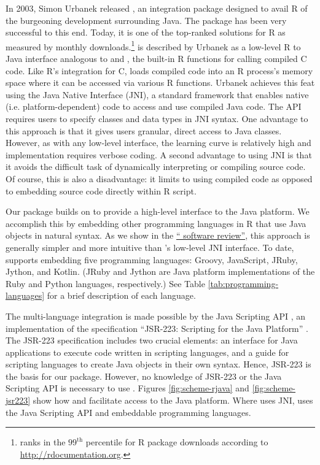 In 2003, Simon Urbanek released  \citeyearpar{rjava}, an integration package designed to avail R of the burgeoning development surrounding Java. The package has been very successful to this end. Today, it is one of the top-ranked solutions for R as measured by monthly downloads.\footnote{ ranks in the $99^{\text{th}}$ percentile for R package downloads according to \url{http://rdocumentation.org}.}  is described by Urbanek as a low-level R to Java interface analogous to  and , the built-in R functions for calling compiled C code. Like R's integration for C,  loads compiled code into an R process's memory space where it can be accessed via various R functions. Urbanek achieves this feat using the Java Native Interface (JNI), a standard framework that enables native (i.e. platform-dependent) code to access and use compiled Java code. The  API requires users to specify classes and data types in JNI syntax. One advantage to this approach is that it gives users granular, direct access to Java classes. However, as with any low-level interface, the learning curve is relatively high and implementation requires verbose coding. A second advantage to using JNI is that it avoids the difficult task of dynamically interpreting or compiling source code. Of course, this is also a disadvantage: it limits  to using compiled code as opposed to embedding source code directly within R script.

Our  package builds on  to provide a high-level interface to the Java platform. We accomplish this by embedding other programming languages in R that use Java objects in natural syntax. As we show in the \hyperlink{rjava-software-review}{`` software review''}, this approach is generally simpler and more intuitive than 's low-level JNI interface. To date,  supports embedding five programming languages: Groovy, JavaScript, JRuby, Jython, and Kotlin. (JRuby and Jython are Java platform implementations of the Ruby and Python languages, respectively.) See Table \ref{tab:programming-languages} for a brief description of each language.

The  multi-language integration is made possible by the Java Scripting API \citep{jsa}, an implementation of the specification “JSR-223: Scripting for the Java Platform” \citep{jsr223spec}. The JSR-223 specification includes two crucial elements: an interface for Java applications to execute code written in scripting languages, and a guide for scripting languages to create Java objects in their own syntax. Hence, JSR-223 is the basis for our package. However, no knowledge of JSR-223 or the Java Scripting API is necessary to use . Figures \ref{fig:scheme-rjava} and \ref{fig:scheme-jsr223} show how  and  facilitate access to the Java platform. Where  uses JNI,  uses the Java Scripting API and embeddable programming languages.

